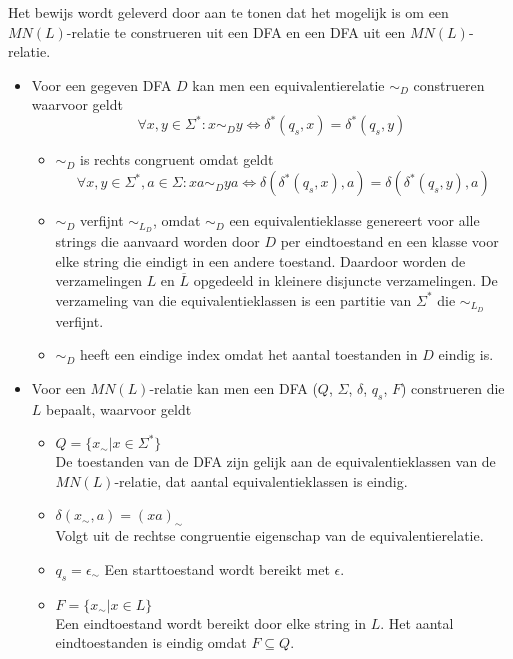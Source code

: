   Het bewijs wordt geleverd door aan te tonen dat het mogelijk is om een $MN(L)$-relatie te construeren uit een DFA en een DFA uit een $MN(L)$-relatie.
  \begin{itemize}
  \item Voor een gegeven DFA $D$ kan men een equivalentierelatie $\sim_D$ construeren waarvoor geldt
  \begin{equation*}
  \forall x, y \in \Sigma^*: x \sim_D y \Leftrightarrow \delta^*(q_s, x) = \delta^*(q_s, y)
  \end{equation*}
  \begin{itemize}
  \item $\sim_D$ is rechts congruent omdat geldt
  \begin{equation*}
  \forall x, y \in \Sigma^*, a \in \Sigma: xa \sim_D ya \Leftrightarrow \delta(\delta^*(q_s, x), a) = \delta(\delta^*(q_s, y), a)
  \end{equation*}
  \item $\sim_D$ verfijnt $\sim_{L_D}$, omdat $\sim_D$ een equivalentieklasse genereert voor alle strings die aanvaard worden door $D$ per eindtoestand en een klasse voor elke string die eindigt in een andere toestand. Daardoor worden de verzamelingen $L$ en $\overline{L}$ opgedeeld in kleinere disjuncte verzamelingen. De verzameling van die equivalentieklassen is een partitie van $\Sigma^*$ die $\sim_{L_D}$ verfijnt.
  \item $\sim_D$ heeft een eindige index omdat het aantal toestanden in $D$ eindig is.
  \end{itemize}
  \item Voor een $MN(L)$-relatie kan men een DFA ($Q$, $\Sigma$, $\delta$, $q_s$, $F$) construeren die $L$ bepaalt, waarvoor geldt
  \begin{itemize}
  \item $Q = \{x_\sim|x \in \Sigma^*\}$\\
  De toestanden van de DFA zijn gelijk aan de equivalentieklassen van de $MN(L)$-relatie, dat aantal equivalentieklassen is eindig.
  \item $\delta(x_\sim, a) = (xa)_\sim$\\
  Volgt uit de rechtse congruentie eigenschap van de equivalentierelatie.
  \item $q_s = \epsilon_\sim$
  Een starttoestand wordt bereikt met $\epsilon$.
  \item $F = \{x_\sim|x \in L\}$\\
  Een eindtoestand wordt bereikt door elke string in $L$. Het aantal eindtoestanden is eindig omdat $F \subseteq Q$.

\end{itemize}
\end{itemize}
